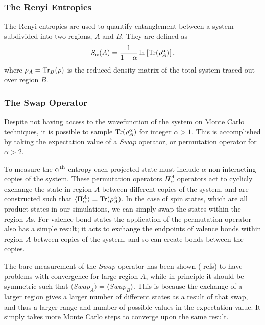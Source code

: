 \documentclass[prb,aps,twocolumn,floatfix,amsmath,amssymb,superscriptaddress,tightenlines]{revtex4}
\begin{document}
\subsubsection{The Renyi Entropies}
The Renyi entropies are used to quantify entanglement between a system subdivided into two regions, $A$ and $B$.
They are defined as 
\begin{equation} \label{renyi}
S_{\alpha}(A) = \frac{1}{1-\alpha}\ln \left[ {\rm Tr}(\rho_A^{\alpha}) \right],
\end{equation}
where $\rho_A = {\rm Tr}_B (\rho)$ is the reduced density matrix of the total system traced out over region $B$.\\

\subsubsection{The Swap Operator}
Despite not having access to the wavefunction of the system on Monte Carlo techniques, it is possible to sample ${\rm Tr}(\rho_A^{\alpha})$ for integer $\alpha > 1$.
This is accomplished by taking the expectation value of a $Swap$ operator, %
or permutation operator for $\alpha > 2$.%


To measure the $\alpha^{\rm th}$ entropy each projected state must include $\alpha$ non-interacting copies of the system.
These permutation operators $\Pi_\alpha^A$ operators act to cyclicly exchange the state in region $A$ between different copies of the system, and are constructed such that  $\langle \Pi_\alpha^A \rangle = {\rm Tr}(\rho_A^{\alpha})$.
In the case of spin states, which are all product states in our simulations, we can simply swap the states within the region $A$s.  
For valence bond states the application of the permutation operator also has a simple result; it acts to exchange the endpoints of valence bonds within region $A$ between copies of the system, and so can create bonds between the copies.

The bare measurement of the $Swap$ operator has been shown ({\color{red} refs}) to have problems with convergence for large region $A$, while in principle it should be symmetric such that $\langle Swap_A \rangle = \langle Swap_B \rangle$.
This is because the exchange of a larger region gives a larger number of different states as a result of that swap, and thus a larger range and number of possible values in the expectation value.
It simply takes more Monte Carlo steps to converge upon the same result.
\end{document}
